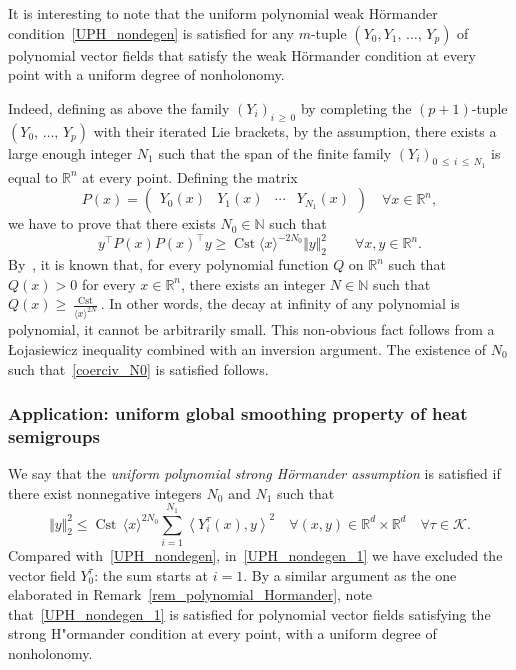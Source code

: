 \documentclass[AHL,Unicode,published]{cedram}
\newcommand*\R{\mathbb{R}}
\newcommand*\N{\mathbb{N}}
\newcommand{\calK}{\mathcal{K}}
\DeclareMathOperator{\Cst}{Cst}
\renewcommand{\geq}{\geqslant}
\renewcommand{\leq}{\leqslant}
\let\oldforall\forall
\renewcommand*{\forall}{\mathrel{\oldforall}}
\begin{document}
\begin{rema}\label{rem_polynomial_Hormander}
It is interesting to note that the uniform polynomial weak H\"ormander condition~\eqref{UPH_nondegen} is satisfied for any $m$-tuple $(Y_0,Y_1,\,\ldots,\,Y_p)$ of polynomial vector fields that satisfy the weak H\"ormander condition at every point with a uniform degree of nonholonomy.

Indeed, defining as above the family $(Y_i)_{i\,\geq\,0}$ by completing the $(p+1)$-tuple $(Y_0,\,\ldots,\,Y_p)$ with their iterated Lie brackets, by the assumption, there exists a large enough integer $N_1$ such that the span of the finite family $(Y_i)_{0\,\leq\,i\,\leq\,N_1}$ is equal to $\R^n$ at every point. Defining the matrix
\[
P(x) =
\begin{pmatrix}
Y_0(x) & Y_1(x) & \cdots & Y_{N_1}(x)
\end{pmatrix} \quad \forall x\in\R^n,
\]
we have to prove that there exists $N_0\in\N$ such that
\begin{equation}\label{coerciv_N0}
y^\top P(x) P(x)^\top y \geq \Cst \langle x\rangle^{-2N_0} \Vert y\Vert_2^2\qquad \forall x,y\in\R^n.
\end{equation}
By~\cite[Lemma~2]{Ho-58}, it is known that, for every polynomial function $Q$ on $\R^n$ such that $Q(x)>0$ for every $x\in\R^n$, there exists an integer $N\in\N$ such that $Q(x)\geq \tfrac{\Cst}{\langle x\rangle^{2N}}$. In other words, the decay at infinity of any polynomial is polynomial, it cannot be arbitrarily small. This non-obvious fact follows from a \L{}ojasiewicz inequality combined with an inversion argument. The existence of $N_0$ such that~\eqref{coerciv_N0} is satisfied follows.
\end{rema}



\subsubsection{Application: uniform global smoothing property of heat semigroups}\label{sec:globalregheat}
We say that the \emph{uniform polynomial strong H\"ormander assumption} is satisfied if there exist nonnegative integers $N_0$ and $N_1$ such that
\begin{equation}\label{UPH_nondegen_1}
\Vert y\Vert_2^2 \leq \Cst\, \langle x\rangle^{2N_0} \sum_{i=1}^{N_1} \left\langle Y_i^\tau(x),y\right\rangle^2
\quad \forall (x,y)\in\R^d\times\R^d\quad\forall \tau\in\calK.
\end{equation}
Compared with~\eqref{UPH_nondegen}, in~\eqref{UPH_nondegen_1} we have excluded the vector field $Y_0^\tau$: the sum starts at $i=1$. By a similar argument as the one elaborated in Remark~\ref{rem_polynomial_Hormander}, note that~\eqref{UPH_nondegen_1} is satisfied for polynomial vector fields satisfying the strong H"ormander condition at every point, with a uniform degree of nonholonomy.
\end{document}
